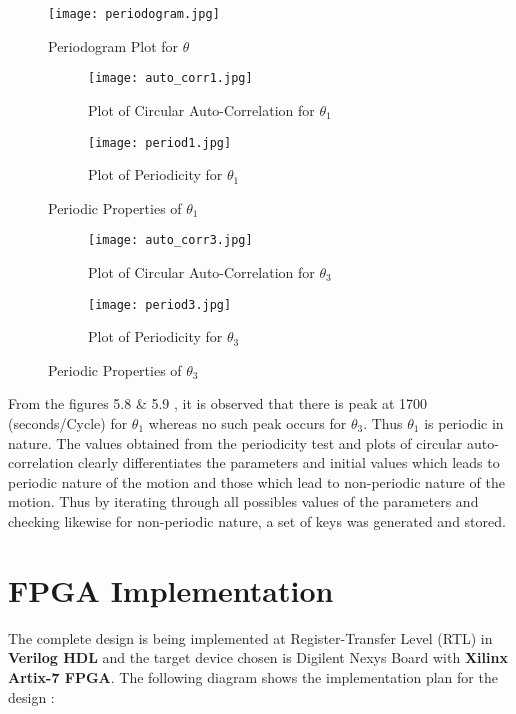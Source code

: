 \begin{figure}[H]
\centering
\texttt{[image: periodogram.jpg]}
\caption{Periodogram Plot for ${\theta}$}\label{fig:periodogram}
\end{figure}


\begin{figure}[H]
\begin{subfigure}{0.5\textwidth}
\texttt{[image: auto\_corr1.jpg]}
\caption{Plot of Circular Auto-Correlation for ${\theta_{1}}$}\label{fig:cir_auto1}
\end{subfigure}
\begin{subfigure}{0.5\textwidth}
\texttt{[image: period1.jpg]}
\caption{Plot of Periodicity for ${\theta_{1}}$}\label{fig:period1}
\end{subfigure}
\caption{Periodic Properties of ${\theta_{1}}$}\label{fig:image4}
\end{figure}

\begin{figure}[H]
\begin{subfigure}{0.5\textwidth}
\texttt{[image: auto\_corr3.jpg]}
\caption{Plot of Circular Auto-Correlation for ${\theta_{3}}$}\label{fig:cir_auto3}
\end{subfigure}
\begin{subfigure}{0.5\textwidth}
\texttt{[image: period3.jpg]}
\caption{Plot of Periodicity for ${\theta_{3}}$}\label{fig:period3}
\end{subfigure}
\caption{Periodic Properties of ${\theta_{3}}$}\label{fig:image5}
\end{figure}

From the figures 5.8 \& 5.9 , it is observed that there is peak at 1700 (seconds/Cycle) for $\theta_{1}$ whereas no such peak occurs for $\theta_{3}$. Thus $\theta_{1}$ is periodic in nature. The values obtained from the periodicity test and plots of circular auto-correlation clearly differentiates the parameters and initial values which leads to periodic nature of the motion and those which lead to non-periodic nature of the motion. Thus by iterating through all possibles values of the parameters and checking likewise for non-periodic nature, a set of keys was generated and stored. 


\section{FPGA Implementation}
The complete design is being implemented at Register-Transfer Level (RTL) in {\bf Verilog HDL} and the target device chosen is Digilent Nexys Board with {\bf Xilinx Artix-7 FPGA}. The following diagram shows the implementation plan for the design :

